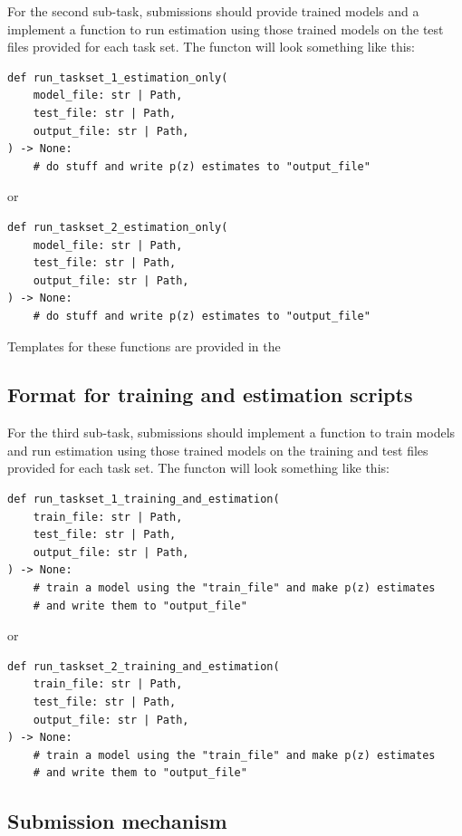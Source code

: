 \documentclass[modern]{desc-tex/styles/lsstdescnote}
\begin{document}
For the second sub-task, submissions should provide trained models and
a implement a function to run estimation using those trained models on
the test files provided for each task set.  The functon will look something like this:

\begin{verbatim}
def run_taskset_1_estimation_only(
    model_file: str | Path,
    test_file: str | Path,
    output_file: str | Path,
) -> None:
    # do stuff and write p(z) estimates to "output_file"
\end{verbatim}

or

\begin{verbatim}
def run_taskset_2_estimation_only(
    model_file: str | Path,
    test_file: str | Path,
    output_file: str | Path,
) -> None:
    # do stuff and write p(z) estimates to "output_file"
\end{verbatim}

Templates for these functions are provided in the 

\subsection{Format for training and estimation scripts}

For the third sub-task, submissions should implement a function to
train models and run  estimation using those trained models on the
training and test files provided for each task set.  The functon will
look something like this:

\begin{verbatim}
def run_taskset_1_training_and_estimation(
    train_file: str | Path,
    test_file: str | Path,
    output_file: str | Path,
) -> None:
    # train a model using the "train_file" and make p(z) estimates 
    # and write them to "output_file"
\end{verbatim}

or

\begin{verbatim}
def run_taskset_2_training_and_estimation(
    train_file: str | Path,
    test_file: str | Path,
    output_file: str | Path,
) -> None:
    # train a model using the "train_file" and make p(z) estimates
    # and write them to "output_file"
\end{verbatim}


\subsection{Submission mechanism}
\end{document}
